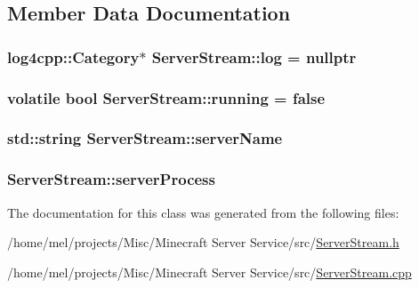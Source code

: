 \subsection{Member Data Documentation}
\subsubsection[{\texorpdfstring{log}{log}}]{\setlength{\rightskip}{0pt plus 5cm}log4cpp\+::\+Category$\ast$ Server\+Stream\+::log = nullptr\hspace{0.3cm}{\ttfamily [protected]}}\hypertarget{class_server_stream_a64e6e1395393de338fca801345bd6f73}{}\label{class_server_stream_a64e6e1395393de338fca801345bd6f73}
\subsubsection[{\texorpdfstring{running}{running}}]{\setlength{\rightskip}{0pt plus 5cm}volatile bool Server\+Stream\+::running = false\hspace{0.3cm}{\ttfamily [protected]}}\hypertarget{class_server_stream_af4b051030db4f09ecfb432d1f797b745}{}\label{class_server_stream_af4b051030db4f09ecfb432d1f797b745}
\subsubsection[{\texorpdfstring{server\+Name}{serverName}}]{\setlength{\rightskip}{0pt plus 5cm}std\+::string Server\+Stream\+::server\+Name\hspace{0.3cm}{\ttfamily [protected]}}\hypertarget{class_server_stream_a7eb3c97f5d635f11a2082081383de04d}{}\label{class_server_stream_a7eb3c97f5d635f11a2082081383de04d}
\subsubsection[{\texorpdfstring{server\+Process}{serverProcess}}]{ Server\+Stream\+::server\+Process\hspace{0.3cm}{\ttfamily [protected]}}\hypertarget{class_server_stream_a410bab9c65dbdab2e861a47a7b8ade72}{}\label{class_server_stream_a410bab9c65dbdab2e861a47a7b8ade72}


The documentation for this class was generated from the following files\+:\begin{DoxyCompactItemize}
\item 
/home/mel/projects/\+Misc/\+Minecraft Server Service/src/\hyperlink{_server_stream_8h}{Server\+Stream.\+h}\item 
/home/mel/projects/\+Misc/\+Minecraft Server Service/src/\hyperlink{_server_stream_8cpp}{Server\+Stream.\+cpp}\end{DoxyCompactItemize}
